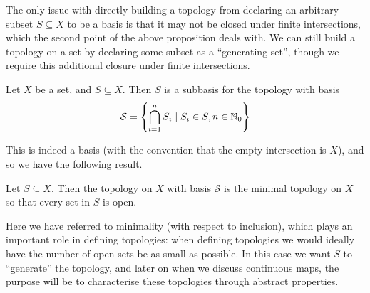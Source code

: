 \documentclass[11pt]{article}
\begin{document}
The only issue with directly building a topology from declaring an arbitrary subset $S \subseteq X$ to be a basis is that it may not be closed under finite intersections, which the second point of the above proposition deals with. We can still build a topology on a set by declaring some subset as a ``generating set'', though we require this additional closure under finite intersections.
\begin{definition}[Subbasis]
    Let $X$ be a set, and $S \subseteq X$. Then $S$ is a subbasis for the topology with basis
    $$
        \mathcal{S} = \left\{  \bigcap_{i = 1}^n S_i \mid S_i \in S, n \in \mathbb{N}_0  \right\}
    $$
\end{definition}
This is indeed a basis (with the convention that the empty intersection is $X$), and so we have the following result.
\begin{lemma}
    Let $S \subseteq X$. Then the topology on $X$ with basis $\mathcal{S}$ is the minimal topology on $X$ so that every set in $S$ is open.
\end{lemma}
Here we have referred to minimality (with respect to inclusion), which plays an important role in defining topologies: when defining topologies we would ideally have the number of open sets be as small as possible. In this case we want $S$ to ``generate'' the topology, and later on when we discuss continuous maps, the purpose will be to characterise these topologies through abstract properties.
\end{document}
